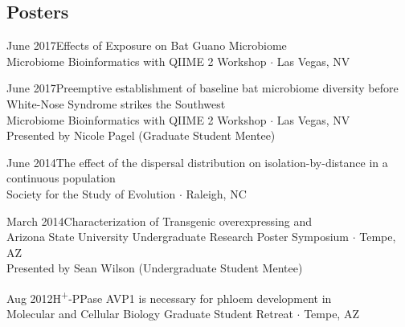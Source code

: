 \documentclass[]{cv-style}          %
\begin{document}
\subsection{Posters}
\begin{entrylist}
\entry
{June 2017}{\normalfont Effects of Exposure on Bat Guano Microbiome}{\\Microbiome Bioinformatics with QIIME 2 Workshop $\cdot$ Las Vegas, NV}
{\vspace{-0.3cm}}
\end{entrylist}

\begin{entrylist}
\entry
{June 2017}{\normalfont Preemptive establishment of baseline bat microbiome diversity before White-Nose Syndrome strikes the Southwest}{\\Microbiome Bioinformatics with QIIME 2 Workshop $\cdot$ Las Vegas, NV\\Presented by Nicole Pagel (Graduate Student Mentee)}
{\vspace{-0.3cm}}
\end{entrylist}

\begin{entrylist}
\entry
{June 2014}{\normalfont The effect of the dispersal distribution on isolation-by-distance in a continuous population}{\\Society for the Study of Evolution $\cdotp$ Raleigh, NC}
{\vspace{-0.3cm}}
\end{entrylist}

\begin{entrylist}
\entry
{March 2014}{\normalfont Characterization of Transgenic  overexpressing  and }{\\Arizona State University Undergraduate Research Poster Symposium $\cdotp$ Tempe, AZ\\
Presented by Sean Wilson (Undergraduate Student Mentee)}
{\vspace{-0.3cm}}
\end{entrylist}

\begin{entrylist}
\entry
{Aug 2012}{\normalfont H\textsuperscript{+}-PPase AVP1 is necessary for phloem development in }{\\Molecular and Cellular Biology Graduate Student Retreat $\cdotp$ Tempe, AZ}
{\vspace{-0.3cm}}
\end{entrylist}
\end{document}
